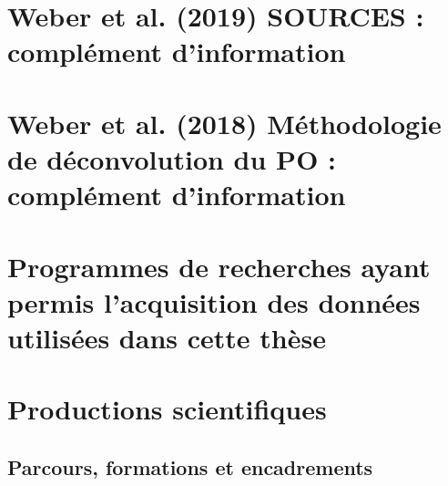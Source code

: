 \documentclass[a4paper,11pt]{book}
\begin{document}
\section{Weber et al. (2019) SOURCES : complément d'information}
\label{annexe:SOURCES_SI}


\section{Weber et al. (2018) Méthodologie de déconvolution du PO : complément d'information}
\label{annexe:deconvol_OP_SI}


\section{Programmes de recherches ayant permis l'acquisition des données utilisées dans cette thèse}%
\label{annexe:programmes_ayant_financés_la_thèses}

\clearpage

\section{Productions scientifiques}
\label{annexe:CV}

\subsection{Parcours, formations et encadrements}%
\label{sub:parcours_formations_et_encadrements}




\end{document}
